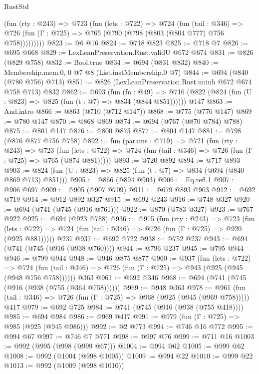 \begin{lexlean}{RustStd}
\begin{coremodule}
        (fun (rty : @243) =>
        @723
          (fun (lets : @722) =>
          @724
            (fun (tail : @346) =>
            @726 (fun (Γ : @725) => @765 (@790 (@798 (@803 (@804 @777) @756 @758)))))))))
@823 := @6 @16
@824 := @718 @823
@825 := @718 @7
@826 := @695 @668
@829 := LexLeanPreservation.Rust.validU @672 @674
@831 := @826 (@829 @758)
@832 := Bool.true
@834 := @694 (@831 @832)
@840 := Membership.mem.{0, 0} @7 @8 (List.instMembership.{0} @7)
@844 := @694 (@840 (@780 @756) @713)
@851 := @826 (LexLeanPreservation.Rust.uninh @672 @674 @758 @713) @832
@862 := @693
    (fun (fn : @49) =>
    @716 (@822 (@824 (fun (U : @823) => @825 (fun (t : @7) => @834 (@844 @851))))))
    @147
@863 := And.intro
@866 := @863 (@710 (@712 @147))
@868 := @775 (@776 @147)
@869 := @780 @147
@870 := @868 @869
@874 := @694 (@767 (@870 @784) @788)
@875 := @801 @147
@876 := @800 @875
@877 := @804 @147
@881 := @798 (@876 @877 @756 @758)
@892 := fun (params : @719) =>
  @721
    (fun (rty : @243) =>
    @723
      (fun (lets : @722) => @724 (fun (tail : @346) => @726 (fun (Γ : @725) => @765 (@874 @881)))))
@893 := @720 @892
@894 := @717 @893
@903 := @824 (fun (U : @823) => @825 (fun (t : @7) => @834 (@694 (@840 @869 @713) @851)))
@905 := @866 (@894 @903)
@906 := Eq.refl.{1}
@907 := @906 @697
@909 := @905 (@907 @709)
@911 := @679 @893 @903
@912 := @692 @719
@914 := @912 @892 @327
@915 := @692 @243
@916 := @748 @327
@920 := @694 (@741 (@745 (@916 @761)))
@922 := @870 (@783 @327)
@923 := @767 @922
@925 := @694 (@923 @788)
@936 := @915
    (fun (rty : @243) =>
    @723
      (fun (lets : @722) => @724 (fun (tail : @346) => @726 (fun (Γ : @725) => @920 (@925 @881)))))
    @237
@937 := @692 @722
@938 := @752 @237
@943 := @694 (@741 (@745 (@916 (@938 @760))))
@944 := @796 @237
@945 := @795 @944
@946 := @799 @944
@948 := @946 @875 @877
@960 := @937
    (fun (lets : @722) =>
    @724 (fun (tail : @346) => @726 (fun (Γ : @725) => @943 (@925 (@945 (@948 @756 @758))))))
    @363
@961 := @692 @346
@968 := @694 (@741 (@745 (@916 (@938 (@755 (@364 @758))))))
@969 := @948 @363
@978 := @961 (fun (tail : @346) => @726 (fun (Γ : @725) => @968 (@925 (@945 (@969 @758))))) @417
@979 := @692 @725
@984 := @741 (@745 (@916 (@938 (@755 @418))))
@985 := @694 @984
@986 := @969 @417
@991 := @979 (fun (Γ : @725) => @985 (@925 (@945 @986)))
@992 := @2 @773
@994 := @746 @16 @772
@995 := @994 @67
@997 := @746 @7 @771
@998 := @997 @76
@999 := @711 @16
@1003 := @992 (@995 (@998 (@999 @67)))
@1004 := @994 @62
@1005 := @999 @62
@1008 := @992 (@1004 (@998 @1005))
@1009 := @994 @22
@1010 := @999 @22
@1013 := @992 (@1009 (@998 @1010))

\end{coremodule}
\end{lexlean}
